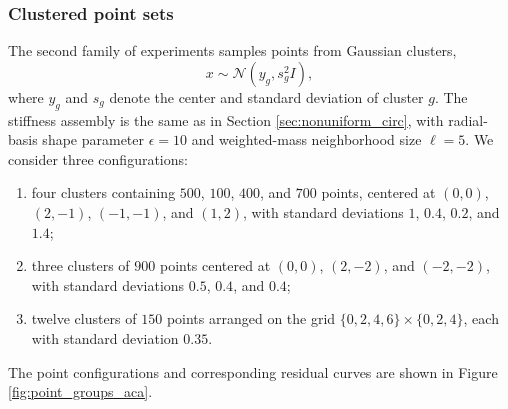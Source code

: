 \documentclass[11pt, preprint]{article}
\begin{document}
\subsubsection{Clustered point sets}

The second family of experiments samples points from Gaussian clusters,
\[
    x\sim\mathcal N(y_g,s_g^2I),
\]
where $y_g$ and $s_g$ denote the center and standard deviation of cluster
$g$. The stiffness assembly is the same as in
Section \ref{sec:nonuniform_circ}, with radial-basis shape parameter
$\epsilon=10$ and weighted-mass neighborhood size $\ell=5$. We consider three
configurations:

\begin{enumerate}
    \item four clusters containing $500$, $100$, $400$, and $700$ points,
    centered at $(0,0)$, $(2,-1)$, $(-1,-1)$, and $(1,2)$, with standard
    deviations $1$, $0.4$, $0.2$, and $1.4$;

    \item three clusters of $900$ points centered at $(0,0)$, $(2,-2)$,
    and $(-2,-2)$, with standard deviations $0.5$, $0.4$, and $0.4$;

    \item twelve clusters of $150$ points arranged on the grid
    $\{0,2,4,6\}\times\{0,2,4\}$, each with standard deviation $0.35$.
\end{enumerate}

The point configurations and corresponding residual curves are shown in
Figure \ref{fig:point_groups_aca}.
\end{document}
